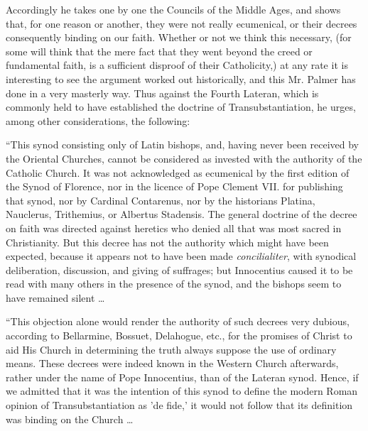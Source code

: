 Accordingly he takes one by one the Councils of
the Middle Ages, and shows that, for one reason or another, they were
not really ecumenical, or their decrees consequently binding on our
faith. Whether or not we think this necessary, (for some will think
that the mere fact that they went beyond the creed or fundamental
faith, is a sufficient disproof of their Catholicity,) at any rate it
is interesting to see the argument worked out historically, and this
Mr. Palmer has done in a very masterly way. Thus against the Fourth
Lateran, which is commonly held to have established the doctrine of
Transubstantiation, he urges, among other considerations, the
following:

``This
synod consisting only of Latin bishops, and, having never been
received by the Oriental Churches, cannot be considered as invested
with the authority of the Catholic Church. It was not acknowledged as
ecumenical by the first edition of the Synod of Florence, nor in the
licence of Pope Clement VII. for publishing that synod, nor by
Cardinal Contarenus, nor by the historians Platina, Nauclerus,
Trithemius, or Albertus Stadensis. The general doctrine of the decree
on faith was directed against heretics who denied all that was most
sacred in Christianity. But this decree has not the authority which
might have been expected, because it appears not to have been made \emph{concilialiter},
with synodical deliberation, discussion, and giving of suffrages; but
Innocentius caused it to be read with many others in the presence of
the synod, and the bishops seem to have remained silent …

``This
objection alone would render the authority of such decrees very
dubious, according to Bellarmine, Bossuet, Delahogue, etc., for the
promises of Christ to aid His Church in determining the truth always
suppose the use of ordinary means. These decrees were indeed known in
the Western Church afterwards, rather under the name of Pope
Innocentius, than of the Lateran synod. Hence, if we admitted that it
was the intention of this synod to define the modern Roman opinion of
Transubstantiation as 'de fide,' it would not follow that its
definition was binding on the Church …

